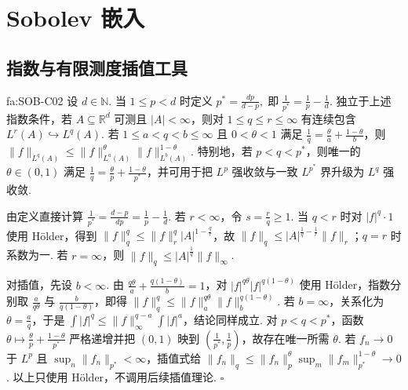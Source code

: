 \section{Sobolev 嵌入}\label{sec:ii14-sobolev-embedding}

\subsection{指数与有限测度插值工具}

\begin{FAProposition}[C][临界指数与本章所需插值]{fa:SOB-C02}
设 \(\displaystyle d\in\mathbb N\). 当 \(\displaystyle1\leqslant p<d\) 时定义 \(\displaystyle p^*=\frac{dp}{d-p}, \;\text{即}\; \frac1{p^*}=\frac1p-\frac1d.\)
独立于上述指数条件，若 \(\displaystyle A\subseteq\mathbb R^d\) 可测且 \(\displaystyle|A|<\infty\)，则对 \(\displaystyle1\leqslant q\leqslant r\leqslant\infty\) 有连续包含 \(\displaystyle L^r(A)\hookrightarrow L^q(A)\). 若 \(\displaystyle1\leqslant a<q<b\leqslant\infty\) 且 \(\displaystyle0<\theta<1\) 满足 \(\displaystyle\frac{1}{q}=\frac{\theta}{a}+\frac{1-\theta}{b}\)，则 \(\displaystyle \|f\|_{L^q(A)} \leqslant \|f\|_{L^a(A)}^\theta \|f\|_{L^b(A)}^{1-\theta}.\)
特别地，若 \(\displaystyle p<q<p^*\)，则唯一的 \(\displaystyle\theta\in(0,1)\) 满足 \(\displaystyle\frac{1}{q}=\frac{\theta}{p}+\frac{1-\theta}{p^*}\)，并可用于把 \(\displaystyle L^p\) 强收敛与一致 \(\displaystyle L^{p^*}\) 界升级为 \(\displaystyle L^q\) 强收敛.
\end{FAProposition}

\begin{FAProof}
由定义直接计算 \(\displaystyle\frac{1}{p^*}=\frac{d-p}{dp}=\frac{1}{p}-\frac{1}{d}\). 若 \(\displaystyle r<\infty\)，令 \(\displaystyle s=\frac{r}{q}\geqslant1\). 当 \(\displaystyle q<r\) 时对 \(\displaystyle |f|^q\cdot1\) 使用 Hölder，得到 \(\displaystyle\|f\|_q^q\leqslant\|f\|_r^q|A|^{1-\frac{q}{r}}\)，故 \(\displaystyle\|f\|_q\leqslant|A|^{\frac{1}{q}-\frac{1}{r}}\|f\|_r\)；\(\displaystyle q=r\) 时系数为一. 若 \(\displaystyle r=\infty\)，则 \(\displaystyle\|f\|_q\leqslant|A|^{\frac{1}{q}}\|f\|_\infty\).

对插值，先设 \(\displaystyle b<\infty\). 由 \(\displaystyle \frac{q\theta}{a}+\frac{q(1-\theta)}{b}=1\)，对 \(\displaystyle |f|^{q\theta}|f|^{q(1-\theta)}\) 使用 Hölder，指数分别取 \(\displaystyle \frac{a}{q\theta}\) 与 \(\displaystyle \frac{b}{q(1-\theta)}\)，即得 \(\displaystyle\|f\|_q^q\leqslant\|f\|_a^{q\theta}\|f\|_b^{q(1-\theta)}\). 若 \(\displaystyle b=\infty\)，关系化为 \(\displaystyle\theta=\frac{a}{q}\)，于是 \(\displaystyle\int|f|^q\leqslant\|f\|_\infty^{q-a}\int|f|^a\)，结论同样成立. 对 \(\displaystyle p<q<p^*\)，函数 \(\displaystyle\theta\mapsto\frac{\theta}{p}+\frac{1-\theta}{p^*}\) 严格递增并把 \(\displaystyle(0,1)\) 映到 \(\displaystyle(\frac{1}{p^*},\frac{1}{p})\)，故存在唯一所需 \(\displaystyle\theta\). 若 \(\displaystyle f_n\to0\) 于 \(\displaystyle L^p\) 且 \(\displaystyle\sup_n\|f_n\|_{p^*}<\infty\)，插值式给 \(\displaystyle\|f_n\|_q\leqslant\|f_n\|_p^\theta\sup_m\|f_m\|_{p^*}^{1-\theta}\to0\). 以上只使用 Hölder，不调用后续插值理论.
\hfill\(\square\)
\end{FAProof}

